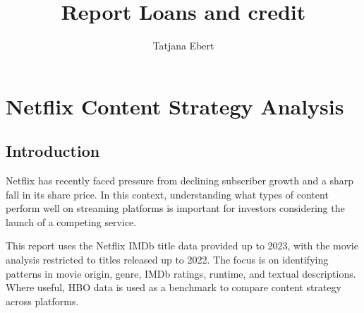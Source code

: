 \documentclass[11pt,preprint]{elsarticle}
\numberwithin{equation}{section}
\numberwithin{figure}{section}
\numberwithin{table}{section}
\begin{document}
\begin{frontmatter}  %

\title{Report Loans and credit}





\author[Add1]{Tatjana Ebert}
\ead{}








\vspace{1cm}





\vspace{0.5cm}

\end{frontmatter}

\setcounter{footnote}{0}



\pagestyle{fancy}
\chead{}
\rhead{}
\lfoot{}
\lhead{}
\cfoot{}


\headsep 35pt %




\section{Netflix Content Strategy
Analysis}\label{netflix-content-strategy-analysis}

\subsection{Introduction}\label{introduction}

Netflix has recently faced pressure from declining subscriber growth and
a sharp fall in its share price. In this context, understanding what
types of content perform well on streaming platforms is important for
investors considering the launch of a competing service.

This report uses the Netflix IMDb title data provided up to 2023, with
the movie analysis restricted to titles released up to 2022. The focus
is on identifying patterns in movie origin, genre, IMDb ratings,
runtime, and textual descriptions. Where useful, HBO data is used as a
benchmark to compare content strategy across platforms.
\end{document}
